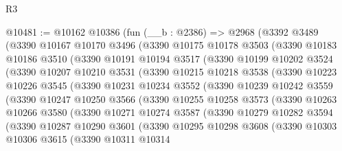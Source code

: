\begin{lexlean}{R3}
\begin{coremodule}
@10481 := @10162
    @10386
    (fun (__b : @2386) =>
    @2968
      (@3392
        @3489
        (@3390
          @10167
          @10170
          @3496
          (@3390
            @10175
            @10178
            @3503
            (@3390
              @10183
              @10186
              @3510
              (@3390
                @10191
                @10194
                @3517
                (@3390
                  @10199
                  @10202
                  @3524
                  (@3390
                    @10207
                    @10210
                    @3531
                    (@3390
                      @10215
                      @10218
                      @3538
                      (@3390
                        @10223
                        @10226
                        @3545
                        (@3390
                          @10231
                          @10234
                          @3552
                          (@3390
                            @10239
                            @10242
                            @3559
                            (@3390
                              @10247
                              @10250
                              @3566
                              (@3390
                                @10255
                                @10258
                                @3573
                                (@3390
                                  @10263
                                  @10266
                                  @3580
                                  (@3390
                                    @10271
                                    @10274
                                    @3587
                                    (@3390
                                      @10279
                                      @10282
                                      @3594
                                      (@3390
                                        @10287
                                        @10290
                                        @3601
                                        (@3390
                                          @10295
                                          @10298
                                          @3608
                                          (@3390
                                            @10303
                                            @10306
                                            @3615
                                            (@3390
                                              @10311
                                              @10314

\end{coremodule}
\end{lexlean}
